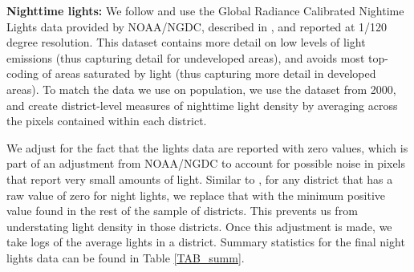 \documentclass[11pt]{article}
\begin{document}
\vspace{.5cm}\noindent\textbf{Nighttime lights:} We follow \citet{hssw2016} and use the Global Radiance Calibrated Nightime Lights data provided by NOAA/NGDC, described in \citet{Elvidge1999}, and reported at 1/120 degree resolution. This dataset contains more detail on low levels of light emissions (thus capturing detail for undeveloped areas), and avoids most top-coding of areas saturated by light (thus capturing more detail in developed areas). To match the data we use on population, we use the dataset from 2000, and create district-level measures of nighttime light density by averaging across the pixels contained within each district.

We adjust for the fact that the lights data are reported with zero values, which is part of an adjustment from NOAA/NGDC to account for possible noise in pixels that report very small amounts of light. Similar to \citet{hssw2016}, for any district that has a raw value of zero for night lights, we replace that with the minimum positive value found in the rest of the sample of districts. This prevents us from understating light density in those districts. Once this adjustment is made, we take logs of the average lights in a district. Summary statistics for the final night lights data can be found in Table \ref{TAB_summ}.
\end{document}
